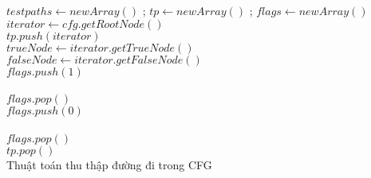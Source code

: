 \begin{algorithm}[!ht]
	\SetAlgoLined
    \BlankLine
    $testpaths \leftarrow new Array()$ \label{gen-path:initArray}; $tp \leftarrow new Array()$ \label{gen-path:initPath}; $flags \leftarrow new Array()$ \label{gen-path:initFlags} \\
    $iterator \leftarrow cfg.getRootNode()$ \label{gen-path:getIterator}
     \\
    $tp.push(iterator)$ \label{gen-path:addToPath} \\
    {
    $trueNode \leftarrow iterator.getTrueNode()$ \label{gen-path:getTrueBranch} \\
    $falseNode \leftarrow iterator.getFalseNode()$ \label{gen-path:getFalseBranch} \\
    $flags.push(1)$ \label{gen-path:addTrueFlag:1}\\
     \label{gen-path:traverseTrueBranch}\\
    $flags.pop()$ \label{gen-path:deleteTrueMark} \\
    $flags.push(0)$ \label{gen-path:addFalseFlag:1}\\
      \label{gen-path:traverseFalseBranch}\\
    $flags.pop()$ \label{gen-path:deleteFalseMark} \\
    }
     $tp.pop()$ \label{gen-path:deleteEndPoint}\\
    \caption{Thuật toán thu thập đường đi trong CFG}
    \label{generate-testpath-alg}
\end{algorithm}

